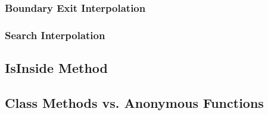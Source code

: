 \documentclass[10pt]{article}
\begin{document}
		\subsubsection{Boundary Exit Interpolation}
		\subsubsection{Search Interpolation}
		
			
	\subsection{IsInside Method}
	
	\subsection{Class Methods vs. Anonymous Functions}
	

\end{document}

